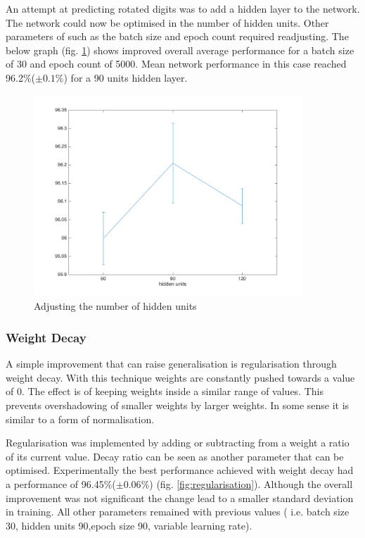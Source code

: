\documentclass[11]{article}
\begin{document}
An attempt at predicting rotated digits was to add a hidden layer to the network. The network could now be optimised in the number of hidden units. Other parameters of such as the batch size and epoch count required readjusting. The below graph (fig. \ref{fig:hiddenunits}) shows improved overall average performance for a batch size of 30 and epoch count of 5000.  Mean network performance in this case reached 96.2\%($\pm 0.1\%$) for a 90 units hidden layer. 
\begin{figure}
\centering
\includegraphics[width=0.9\textwidth]{hiddenunits.png}
\caption{Adjusting the number of hidden units}
\label{fig:hiddenunits}
\end{figure}

\subsubsection{Weight Decay}
A simple improvement that can raise generalisation is regularisation through weight decay. With this technique weights are constantly pushed towards a value of 0. The effect is of keeping weights inside a similar range of values. This prevents overshadowing of smaller weights by larger weights. In some sense it is similar to a form of normalisation.

Regularisation was implemented by adding or subtracting from a weight a ratio of its current value. Decay ratio can be seen as another parameter that can be optimised. Experimentally the best performance achieved with weight decay had a performance of 96.45\%($\pm 0.06\%$) (fig. \ref{fig:regularisation}).  Although the overall  improvement was not significant the change lead to a smaller standard deviation in training. All other parameters remained with previous values ( i.e. batch size 30, hidden units 90,epoch size 90, variable learning rate).
\end{document}
